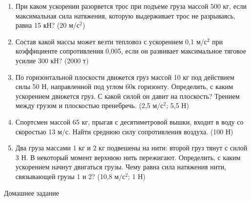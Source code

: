 \documentclass[a6paper, 11pt]{diss_4}
\renewcommand{\'}{\,'}
\begin{document}
\begin{enumerate}

  \item При каком ускорении разорвется трос при подъеме груза массой 500 кг, если максимальная сила натяжения, которую выдерживает трос не разрываясь, равна 15 кН?
(20 $м/с^2$)

  \item Состав какой массы может везти тепловоз с ускорением 0,1 $м/с^2$ при коэффициенте сопротивления 0,005, если он развивает максимальное тяговое усилие 300 кН?
(2000 т)

  \item По горизонтальной плоскости движется груз массой 10 кг под действием силы 50 Н, направленной под углом 60\textdegree к горизонту. Определить, с каким ускорением движется груз. С какой силой он давит на плоскость? Трением между грузом и плоскостью пренебречь.
(2,5 $м/с^2$;    5,5 Н)

  \item Спортсмен массой 65 кг, прыгая с десятиметровой вышки, входит в воду со скоростью 13 м/с. Найти среднюю силу сопротивления воздуха.
(100 Н)

  \item Два груза массами 1 кг и 2 кг подвешены на нити: второй груз тянут с силой 3 Н. В некоторый момент верхнюю нить пережигают. Определить, с каким ускорением начнут двигаться грузы. Чему равна сила натяжения нити, связывающей грузы 1 и 2?
(10,8 $м/с^2$; 1 Н)

\end{enumerate}
\begin{center}
Домашнее задание
\end{center}
\end{document}
